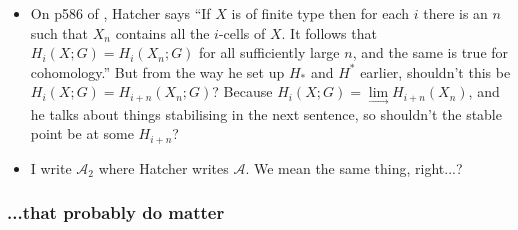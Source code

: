 \documentclass{MetricNotes2023}
\def\A{\ensuremath{\mathscr{A}_2}}
\begin{document}
\begin{itemize}
\item On p586 of \autocite{hatcher5}, Hatcher says ``If \(X\) is of finite type then for each \(i\) there is an \(n\) such that \(X_n\) contains all the \(i\)-cells of \(X\). It follows that \(H_i(X;G)=H_i(X_n;G)\) for all sufficiently large \(n\), and the same is true for cohomology.'' But from the way he set up \(H_*\) and \(H^*\) earlier, shouldn't this be \(H_i(X;G)=H_{i+n}(X_n; G)\)? Because \(H_i(X;G)=\lim\limits_{\rightarrow}H_{i+n}(X_n)\), and he talks about things stabilising in the next sentence, so shouldn't the stable point be at some \(H_{i+n}\)?

\item I write \(\A\) where Hatcher writes \(\mathscr{A}\). We mean the same thing, right...?

\end{itemize}

\subsubsection{...that probably do matter}\label{2504011259timeforlunchithink}
\end{document}
